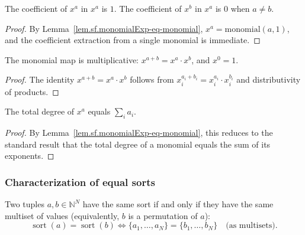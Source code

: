 \begin{lemma}
\label{lem.sf.monomialExp-coeff}
\leanhelper
\leanok
The coefficient of $x^a$ in $x^a$ is $1$.
The coefficient of $x^b$ in $x^a$ is $0$ when $a \neq b$.
\end{lemma}

\begin{proof}
\leanok
By Lemma~\ref{lem.sf.monomialExp-eq-monomial}, $x^a = \mathrm{monomial}(a, 1)$, and
the coefficient extraction from a single monomial is immediate.
\end{proof}

\begin{lemma}
\label{lem.sf.monomialExp-multiplicative}
\leanhelper
\leanok
The monomial map is multiplicative: $x^{a+b} = x^a \cdot x^b$, and $x^0 = 1$.
\end{lemma}

\begin{proof}
\leanok
The identity $x^{a+b} = x^a \cdot x^b$ follows from $x_i^{a_i + b_i} = x_i^{a_i} \cdot x_i^{b_i}$
and distributivity of products.
\end{proof}

\begin{lemma}
\label{lem.sf.monomialExp-degree}
\leanhelper
\leanok
The total degree of $x^a$ equals $\sum_i a_i$.
\end{lemma}

\begin{proof}
\leanok
By Lemma~\ref{lem.sf.monomialExp-eq-monomial}, this reduces to the standard
result that the total degree of a monomial equals the sum of its exponents.
\end{proof}

\subsubsection{Characterization of equal sorts}

\begin{lemma}
\label{lem.sf.sort-eq-iff}
\leanhelper
\leanok
Two tuples $a, b \in \mathbb{N}^N$ have the same sort if and only if they have the
same multiset of values (equivalently, $b$ is a permutation of $a$):
\[
\operatorname{sort}(a) = \operatorname{sort}(b) \iff \{a_1, \ldots, a_N\} = \{b_1, \ldots, b_N\}
\quad \text{(as multisets)}.
\]
\end{lemma}

